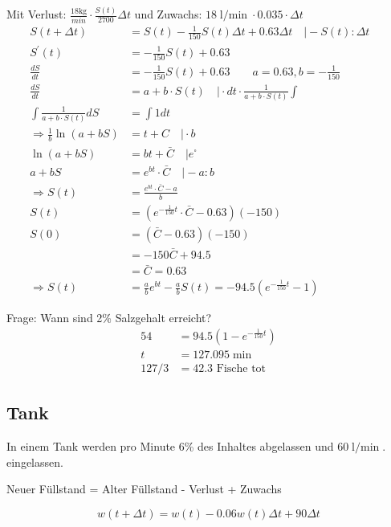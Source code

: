 \documentclass[a4paper, ngerman, 11pt]{scrarticle}
\begin{document}
	Mit Verlust: $\frac{18\si{\kilogram}}{min}\cdot\frac{S(t)}{2700}\Delta t$ und Zuwachs: $18\si{\l\per\min} \cdot 0.035 \cdot \Delta t$
	\\
	\begin{align*}
		S(t + \Delta t) &= S(t) - \frac{1}{150}S(t) \Delta t + 0.63\Delta t \quad \vert -S(t) :\Delta t &&\\
		S^\prime(t) &=  - \frac{1}{150}S(t) + 0.63\\
		\frac{dS}{dt} &=  - \frac{1}{150}S(t) + 0.63 \qquad a = 0.63, b = -\frac{1}{150}\\
		\frac{dS}{dt} &= a + b\cdot S(t) \quad \vert \cdot dt \cdot \frac{1}{a + b\cdot S(t)} \int\\
		\int \frac{1}{a + b\cdot S(t)} dS &= \int 1 dt\\
		\Rightarrow \frac{1}{b} \ln(a+bS) &= t + C \quad \vert \cdot b\\
		\ln(a+bS) &= bt + \bar{C} \quad \vert e^\square\\
		a+bS &= e^{bt}\cdot \bar{C} \quad \vert -a :b\\
		\Rightarrow S(t) &= \frac{e^{bt}\cdot \bar{C}-a}{b}\\
		S(t) &= (e^{-\frac{1}{150}t}\cdot \bar{C}-0.63) (-150)\\
		S(0) &= (\bar{C}-0.63)(-150)\\
		&= -150\bar{C}+94.5\\
		&=\bar{C} = 0.63\\
		\Rightarrow S(t) &= \frac{a}{b} e^{bt} - \frac{a}{b}
		S(t) = -94.5(e ^{-\frac{1}{150}t}-1)
	\end{align*}

	Frage:
	Wann sind 2\% Salzgehalt erreicht?
	\begin{align*}
		54 &= 94.5(1- e ^{-\frac{1}{150}t})\\
		t &= 127.095\min\\
		127/3  &= 42.3  \text{ Fische tot}
	\end{align*}	

	\subsection*{Tank}
	In einem Tank werden pro Minute 6\% des Inhaltes abgelassen und 60$\si{\l\per\min}$. eingelassen.
	
	Neuer Füllstand = Alter Füllstand - Verlust + Zuwachs
	
	$$w(t+\Delta t) = w(t) - 0.06w(t)\Delta t + 90 \Delta t$$
	
\end{document}
